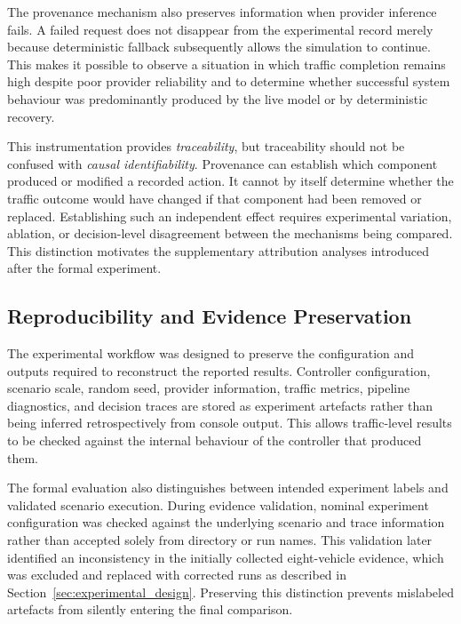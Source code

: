 \documentclass[letterpaper,10pt,conference]{ieeeconf}
\begin{document}
The provenance mechanism also preserves information when provider inference fails. A failed request does not disappear from the experimental record merely because deterministic fallback subsequently allows the simulation to continue. This makes it possible to observe a situation in which traffic completion remains high despite poor provider reliability and to determine whether successful system behaviour was predominantly produced by the live model or by deterministic recovery.



This instrumentation provides \emph{traceability}, but traceability should not be confused with \emph{causal identifiability}. Provenance can establish which component produced or modified a recorded action. It cannot by itself determine whether the traffic outcome would have changed if that component had been removed or replaced. Establishing such an independent effect requires experimental variation, ablation, or decision-level disagreement between the mechanisms being compared. This distinction motivates the supplementary attribution analyses introduced after the formal experiment.



\subsection{Reproducibility and Evidence Preservation}



The experimental workflow was designed to preserve the configuration and outputs required to reconstruct the reported results. Controller configuration, scenario scale, random seed, provider information, traffic metrics, pipeline diagnostics, and decision traces are stored as experiment artefacts rather than being inferred retrospectively from console output. This allows traffic-level results to be checked against the internal behaviour of the controller that produced them.



The formal evaluation also distinguishes between intended experiment labels and validated scenario execution. During evidence validation, nominal experiment configuration was checked against the underlying scenario and trace information rather than accepted solely from directory or run names. This validation later identified an inconsistency in the initially collected eight-vehicle evidence, which was excluded and replaced with corrected runs as described in Section~\ref{sec:experimental_design}. Preserving this distinction prevents mislabeled artefacts from silently entering the final comparison.
\end{document}
